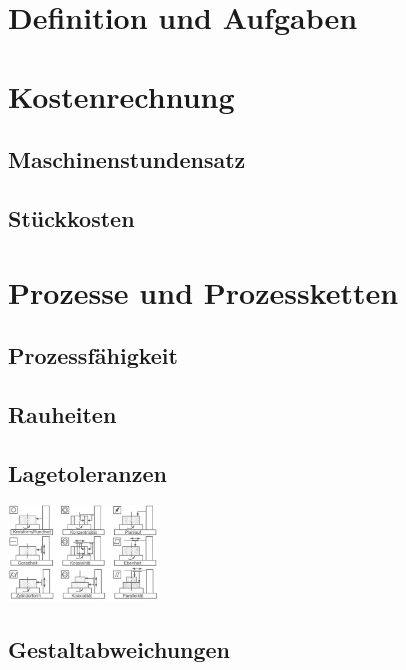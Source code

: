 \documentclass[12pt]{cheatsheet}
\author{Gian Maria Ernst :)) - ernstg\\  \vspace*{0.2em} \normalsize{Based on the work by F. Spengler} \vspace*{-0.2em}}\doctitle{Fertigunstechnik}
\begin{document}
\small

\section*{Definition und Aufgaben}
    

\section*{Kostenrechnung}
    \subsection*{Maschinenstundensatz}
    
    \subsection*{Stückkosten}
    
    \vfill \null \columnbreak

\section*{Prozesse und Prozessketten}
    
    
    \subsection*{Prozessfähigkeit}
    
    \subsection*{Rauheiten}
    
    \subsection*{Lagetoleranzen}
    \includegraphics[width = 40mm]{src/images/lagetoleranzen.png}
    \subsection*{Gestaltabweichungen}
    
\end{document}
